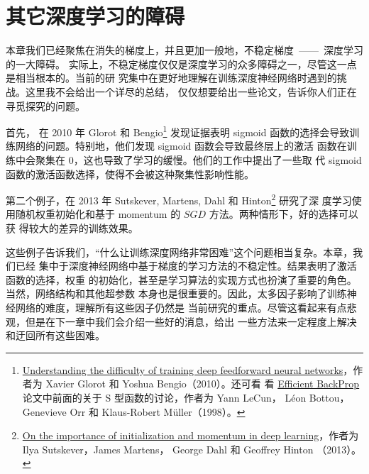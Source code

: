 \section{其它深度学习的障碍}

本章我们已经聚焦在消失的梯度上，并且更加一般地，不稳定梯度~——~深度学习的一大障碍。
实际上，不稳定梯度仅仅是深度学习的众多障碍之一，尽管这一点是相当根本的。当前的研
究集中在更好地理解在训练深度神经网络时遇到的挑战。这里我不会给出一个详尽的总结，
仅仅想要给出一些论文，告诉你人们正在寻觅探究的问题。
 
首先，
在 2010 年 Glorot 和
Bengio\footnote{\href{http://jmlr.org/proceedings/papers/v9/glorot10a/glorot10a.pdf}{Understanding
    the difficulty of training deep feedforward neural networks}，作者为 Xavier
  Glorot 和 Yoshua Bengio（2010）。还可看
  看 \href{http://yann.lecun.com/exdb/publis/pdf/lecun-98b.pdf}{Efficient
    BackProp} 论文中前面的关于 S 型函数的讨论，作者为 Yann LeCun， Léon
  Bottou， Genevieve Orr 和 Klaus-Robert Müller（1998）。} 发现证据表明 sigmoid
函数的选择会导致训练网络的问题。特别地，他们发现 sigmoid 函数会导致最终层上的激活
函数在训练中会聚集在 $0$，这也导致了学习的缓慢。他们的工作中提出了一些取
代 sigmoid 函数的激活函数选择，使得不会被这种聚集性影响性能。
 
第二个例子，在 2013 年 Sutskever, Martens,
Dahl 和
Hinton\footnote{\href{http://www.cs.toronto.edu/~hinton/absps/momentum.pdf}{On
    the importance of initialization and momentum in deep learning}，作者为 Ilya
  Sutskever，James Martens， George Dahl 和 Geoffrey Hinton （2013）。} 研究了深
度学习使用随机权重初始化和基于 momentum 的 $SGD$ 方法。两种情形下，好的选择可以获
得较大的差异的训练效果。

这些例子告诉我们，“什么让训练深度网络非常困难”这个问题相当复杂。本章，我们已经
集中于深度神经网络中基于梯度的学习方法的不稳定性。结果表明了激活函数的选择，权重
的初始化，甚至是学习算法的实现方式也扮演了重要的角色。当然，网络结构和其他超参数
本身也是很重要的。因此，太多因子影响了训练神经网络的难度，理解所有这些因子仍然是
当前研究的重点。尽管这看起来有点悲观，但是在下一章中我们会介绍一些好的消息，给出
一些方法来一定程度上解决和迂回所有这些困难。
